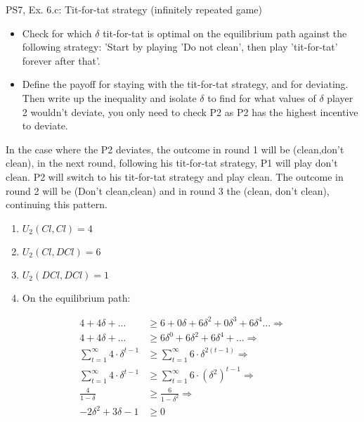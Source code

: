 \begin{frame}{PS7, Ex. 6.c: Tit-for-tat strategy (infinitely repeated game)}
    \begin{itemize}
    \item[(c)] Check for which $\delta$ tit-for-tat is optimal on the equilibrium path against the following strategy: ’Start by playing ’Do not clean’, then play ’tit-for-tat’ forever after that’.
    \end{itemize}
    \vspace{-8pt}
  \begin{multicols}{2}
    \begin{itemize}
        \item[(Step a)] Define the payoff for staying with the tit-for-tat strategy, and for deviating. Then write up the inequality and isolate $\delta$ to find for what values of $\delta$ player 2 wouldn't deviate, you only need to check P2 as P2 has the highest incentive to deviate.
    \end{itemize}
    In the case where the P2 deviates, the outcome in round 1 will be (clean,don't clean), in the next round, following his tit-for-tat strategy, P1 will play don't clean. P2 will switch to his tit-for-tat strategy and play clean. The outcome in round 2 will be (Don't clean,clean) and in round 3 the (clean, don't clean), continuing this pattern.
    \vfill\null\columnbreak
    \begin{enumerate}
        \item $U_2(Cl,Cl) = 4$
        \item $U_2(Cl,DCl) = 6$
        \item $U_2(DCl,DCl) = 1$
        \item On the equilibrium path:
    \end{enumerate}
    \vspace{-10pt}
    \begin{align*}
          4+4\delta+...&\geq6+0\delta+6\delta^2+0\delta^3+6\delta^4...\Rightarrow\\
          4+4\delta+...&\geq6\delta^0+6\delta^2+6\delta^4+...\Rightarrow\\
          \sum_{t=1}^{\infty} 4\cdot\delta^{t-1}&\geq \sum_{t=1}^{\infty} 6\cdot\delta^{2(t-1)}\Rightarrow\\
          \sum_{t=1}^{\infty} 4\cdot\delta^{t-1}&\geq \sum_{t=1}^{\infty} 6\cdot(\delta^2)^{t-1}\Rightarrow\\
          \frac{4}{1-\delta} &\geq \frac{6}{1-\delta^2}\Rightarrow\\
          -2\delta^2 + 3\delta - 1 &\geq 0
    \end{align*}
    \vfill\null
  \end{multicols}
\end{frame}

